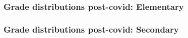 \documentclass{beamer}
\begin{document}
\begin{frame}
    \label{update_scott}
    \frametitle{Grade distributions post-covid: Elementary}
 {
    }
\end{frame}

\begin{frame}
    \label{update_scott}
    \frametitle{Grade distributions post-covid: Secondary}
 {
    }
\end{frame}
\end{document}
